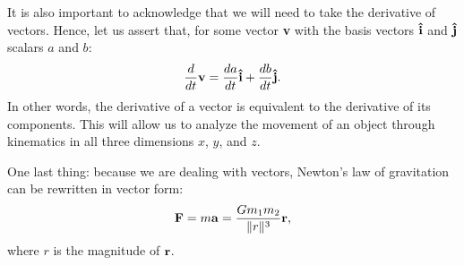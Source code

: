 It is also important to acknowledge that we will need to take the derivative of vectors. Hence, let us assert that, for some vector \textbf{v} with the basis vectors $\uvec{i}$ and $\uvec{j}$ scalars $a$ and $b$:
\begin{equation*}
	\frac{d}{dt}\bvec{v} = \frac{da}{dt}\uvec{i} + \frac{db}{dt}\uvec{j} \text{.}
\end{equation*}
In other words, the derivative of a vector is equivalent to the derivative of its components.
This will allow us to analyze the movement of an object through kinematics in all three dimensions $x$, $y$, and $z$.

\newpage

One last thing: because we are dealing with vectors, Newton's law of gravitation can be rewritten in vector form:
\begin{equation*}
	\bm{\mathbf{F}} = m\bm{\mathbf{a}} = \frac{Gm_1m_2}{\|r\|^3}\bm{\mathbf{r}} \text{,}
\end{equation*}
where $r$ is the magnitude of $\bm{\mathbf{r}}$.

